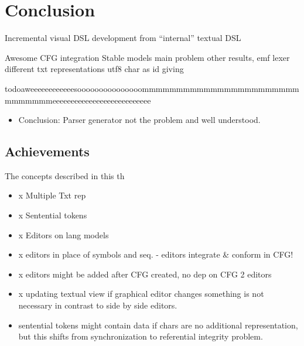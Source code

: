 \chapter{Conclusion}

Incremental visual DSL development from ``internal'' textual DSL

Awesome CFG integration
Stable models main problem
other results,
emf lexer
different txt representations
utf8 char as id giving






todo{aweeeeeeeeeeeesooooooooooooooommmmmmmmmmmmmmmmmmmmmmmmmmmmmmeeeeeeeeeeeeeeeeeeeeeeeeeee}

\begin{itemize}
	\item Conclusion: Parser generator not the problem and well understood.
\end{itemize}	



\section{Achievements}
The concepts described in this th
\begin{itemize}
	\item x Multiple Txt rep
	\item x Sentential tokens
	\item x Editors on lang models
	\item x editors in place of symbols and seq. - editors integrate \& conform in CFG!
	\item x editors might be added after CFG created, no dep on CFG 2 editors
	\item x updating textual view if graphical editor changes something is not necessary in contrast to side by side editors.
	\item sentential tokens might contain data if chars are no additional representation, but this shifts from synchronization to referential integrity problem.
\end{itemize}

